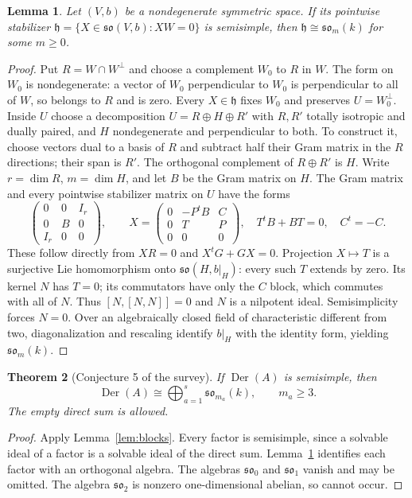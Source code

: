 \documentclass[11pt]{article}
\newtheorem{theorem}{Theorem}
\newtheorem{lemma}[theorem]{Lemma}
\DeclareMathOperator{\Der}{Der}
\newcommand{\so}{\mathfrak{so}}
\begin{document}
\begin{lemma}\label{lem:stabilizer}
Let $(V,b)$ be a nondegenerate symmetric space. If its pointwise stabilizer
$\mathfrak h=\{X\in\so(V,b):XW=0\}$ is semisimple, then
$\mathfrak h\cong\so_m(k)$ for some $m\ge0$.
\end{lemma}
\begin{proof}
Put $R=W\cap W^\perp$ and choose a complement $W_0$ to $R$ in $W$.
The form on $W_0$ is nondegenerate: a vector of $W_0$ perpendicular to $W_0$
is perpendicular to all of $W$, so belongs to $R$ and is zero.
Every $X\in\mathfrak h$ fixes $W_0$ and preserves $U=W_0^\perp$.
Inside $U$ choose a decomposition $U=R\oplus H\oplus R'$ with $R,R'$
totally isotropic and dually paired, and $H$ nondegenerate and perpendicular
to both. To construct it, choose vectors dual to a basis of $R$ and subtract
half their Gram matrix in the $R$ directions; their span is $R'$.
The orthogonal complement of $R\oplus R'$ is $H$.
Write $r=\dim R$, $m=\dim H$, and let $B$ be the Gram matrix on $H$.
The Gram matrix and every pointwise stabilizer matrix on $U$ have the forms
\[
 \begin{pmatrix}0&0&I_r\\0&B&0\\I_r&0&0\end{pmatrix},
 \qquad
 X=\begin{pmatrix}0&-P^{t}B&C\\0&T&P\\0&0&0\end{pmatrix},
 \quad T^tB+BT=0,\quad C^t=-C.
\]
These follow directly from $XR=0$ and $X^tG+GX=0$.
Projection $X\mapsto T$ is a surjective Lie homomorphism onto $\so(H,b|_H)$:
every such $T$ extends by zero.
Its kernel $N$ has $T=0$; its commutators have only the $C$ block, which
commutes with all of $N$. Thus $[N,[N,N]]=0$ and $N$ is a nilpotent ideal.
Semisimplicity forces $N=0$. Over an algebraically closed field of
characteristic different from two, diagonalization and rescaling identify
$b|_H$ with the identity form, yielding $\so_m(k)$.
\end{proof}

\begin{theorem}[Conjecture 5 of the survey]\label{thm:classification}
If $\Der(A)$ is semisimple, then
\[
 \Der(A)\cong\bigoplus_{a=1}^s\so_{m_a}(k),\qquad m_a\ge3.
\]
The empty direct sum is allowed.
\end{theorem}
\begin{proof}
Apply Lemma~\ref{lem:blocks}. Every factor is semisimple, since a solvable
ideal of a factor is a solvable ideal of the direct sum.
Lemma~\ref{lem:stabilizer} identifies each factor with an orthogonal algebra.
The algebras $\so_0$ and $\so_1$ vanish and may be omitted.
The algebra $\so_2$ is nonzero one-dimensional abelian, so cannot occur.
\end{proof}
\end{document}
